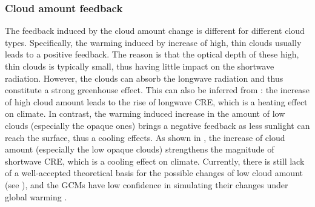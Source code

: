 \subsubsection{Cloud amount feedback}
The feedback induced by the cloud amount change is different for different cloud types. Specifically, the warming induced
by increase of high, thin clouds usually leads to a positive feedback. The reason is that the optical depth of these high,
thin clouds is typically small, thus having little impact on the shortwave radiation. However, the clouds can absorb the longwave radiation and thus constitute a strong greenhouse effect. This can also be inferred from : the increase of high cloud amount leads to the rise of longwave CRE, which is a heating effect on climate. In contrast, the warming induced increase in the amount of low clouds (especially the opaque ones) brings a negative feedback as less sunlight can reach the surface, thus a cooling effects. As shown in , the increase of cloud amount (especially the low opaque clouds) strengthens the magnitude of shortwave CRE, which is a cooling effect on climate. Currently, there is still lack of a well-accepted theoretical basis for the possible changes of low cloud amount (see ), and the GCMs have low confidence in simulating their changes under global warming \citep{Stocker2013}.


